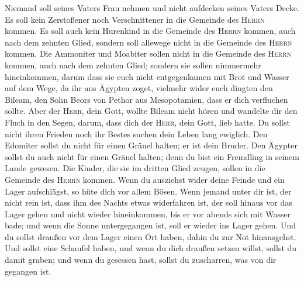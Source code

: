  Niemand soll seines Vaters Frau nehmen und nicht
aufdecken seines Vaters Decke.  Es soll kein Zerstoßener
noch Verschnittener in die Gemeinde des \textsc{Herrn} kommen.
 Es soll auch kein Hurenkind in die Gemeinde des
\textsc{Herrn} kommen, auch nach dem zehnten Glied, sondern soll
allewege nicht in die Gemeinde des \textsc{Herrn} kommen. 
Die Ammoniter und Moabiter sollen nicht in die Gemeinde des
\textsc{Herrn} kommen, auch nach dem zehnten Glied; sondern sie sollen
nimmermehr hineinkommen,  darum dass sie euch nicht
entgegenkamen mit Brot und Wasser auf dem Wege, da ihr aus Ägypten
zoget, vielmehr wider euch dingten den Bileam, den Sohn Beors von Pethor
aus Mesopotamien, dass er dich verfluchen sollte.  Aber
der \textsc{Herr}, dein Gott, wollte Bileam nicht hören und wandelte dir
den Fluch in den Segen, darum, dass dich der \textsc{Herr}, dein Gott,
lieb hatte.  Du sollst nicht ihren Frieden noch ihr Bestes
suchen dein Leben lang ewiglich.  Den Edomiter sollst du
nicht für einen Gräuel halten; er ist dein Bruder. Den Ägypter sollst du
auch nicht für einen Gräuel halten; denn du bist ein Fremdling in seinem
Lande gewesen.  Die Kinder, die sie im dritten Glied
zeugen, sollen in die Gemeinde des \textsc{Herrn} kommen.
 Wenn du ausziehst wider deine Feinde und ein Lager
aufschlägst, so hüte dich vor allem Bösen.  Wenn jemand
unter dir ist, der nicht rein ist, dass ihm des Nachts etwas widerfahren
ist, der soll hinaus vor das Lager gehen und nicht wieder hineinkommen,
 bis er vor abends sich mit Wasser bade; und wenn die
Sonne untergegangen ist, soll er wieder ins Lager gehen. 
Und du sollst draußen vor dem Lager einen Ort haben, dahin du zur Not
hinausgehst.  Und sollst eine Schaufel haben, und wenn du
dich draußen setzen willst, sollst du damit graben; und wenn du gesessen
hast, sollst du zuscharren, was von dir gegangen ist.

